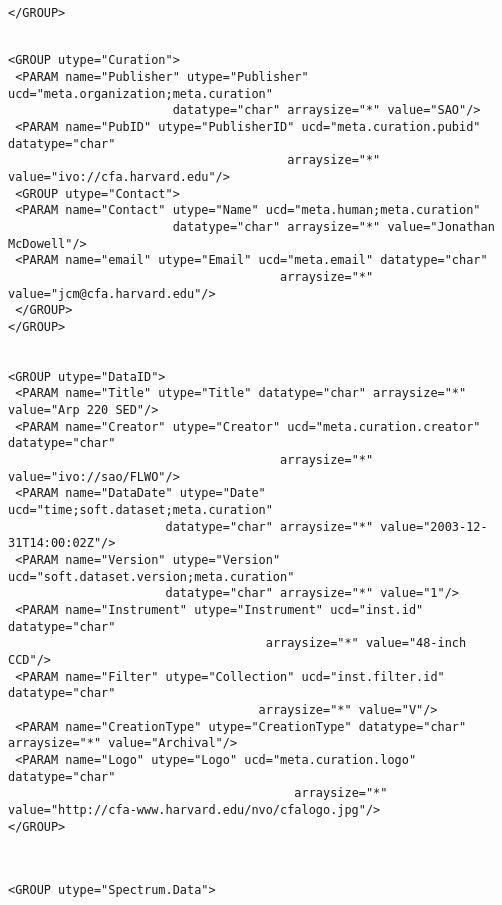 {\begin{flushleft}
\begin{fmpage}
\begin{verbatim}
</GROUP>
\end{verbatim}
\end{fmpage}

\begin{fmpage}
\begin{verbatim}

<GROUP utype="Curation">
 <PARAM name="Publisher" utype="Publisher" ucd="meta.organization;meta.curation" 
                       datatype="char" arraysize="*" value="SAO"/>
 <PARAM name="PubID" utype="PublisherID" ucd="meta.curation.pubid" datatype="char" 
                                       arraysize="*" value="ivo://cfa.harvard.edu"/>
 <GROUP utype="Contact">
 <PARAM name="Contact" utype="Name" ucd="meta.human;meta.curation" 
                       datatype="char" arraysize="*" value="Jonathan McDowell"/>
 <PARAM name="email" utype="Email" ucd="meta.email" datatype="char" 
                                      arraysize="*" value="jcm@cfa.harvard.edu"/>
 </GROUP>
</GROUP>


<GROUP utype="DataID">
 <PARAM name="Title" utype="Title" datatype="char" arraysize="*" value="Arp 220 SED"/>
 <PARAM name="Creator" utype="Creator" ucd="meta.curation.creator" datatype="char" 
                                      arraysize="*" value="ivo://sao/FLWO"/>
 <PARAM name="DataDate" utype="Date" ucd="time;soft.dataset;meta.curation"
                      datatype="char" arraysize="*" value="2003-12-31T14:00:02Z"/>
 <PARAM name="Version" utype="Version" ucd="soft.dataset.version;meta.curation" 
                      datatype="char" arraysize="*" value="1"/>
 <PARAM name="Instrument" utype="Instrument" ucd="inst.id" datatype="char" 
                                    arraysize="*" value="48-inch CCD"/>
 <PARAM name="Filter" utype="Collection" ucd="inst.filter.id" datatype="char" 
                                   arraysize="*" value="V"/>
 <PARAM name="CreationType" utype="CreationType" datatype="char" arraysize="*" value="Archival"/>
 <PARAM name="Logo" utype="Logo" ucd="meta.curation.logo" datatype="char" 
                                        arraysize="*" value="http://cfa-www.harvard.edu/nvo/cfalogo.jpg"/>
</GROUP>



\end{verbatim}
\end{fmpage}

\begin{fmpage}
\begin{verbatim}
<GROUP utype="Spectrum.Data">


\end{verbatim}
\end{fmpage}
\end{flushleft}}
